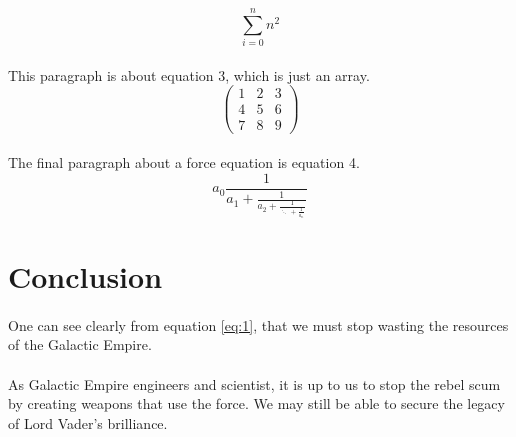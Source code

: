 \documentclass[12pt]{article}
\begin{document}
    \begin{equation}
	\sum_{i=0}^n n^2
	\end{equation}
    	
    \paragraph{}
    This paragraph is about equation 3, which is just an array.
    \begin{equation}
\left(\begin{array}{ccc}1 & 2 & 3\\ 4 & 5 & 6\\ 7 & 8 & 9\end{array}\right) 
	\end{equation}
	
	\paragraph{}
	The final paragraph about a force equation is equation 4.
	    \begin{equation}
a_0 \frac{1}{
a_1+ \frac{1}{
a_2+ \frac{1}{
\ddots \, + \frac{1}{
a_n
}}}}
	\end{equation}
	
	
\section{Conclusion}
\paragraph{}
One can see clearly from equation \ref{eq:1}, that we must stop wasting the resources of the Galactic Empire.

\paragraph{}
As Galactic Empire engineers and scientist, it is up to us to stop the rebel scum by creating weapons that use the force. We may still be able to secure the legacy of Lord Vader's brilliance.  
\end{document}
